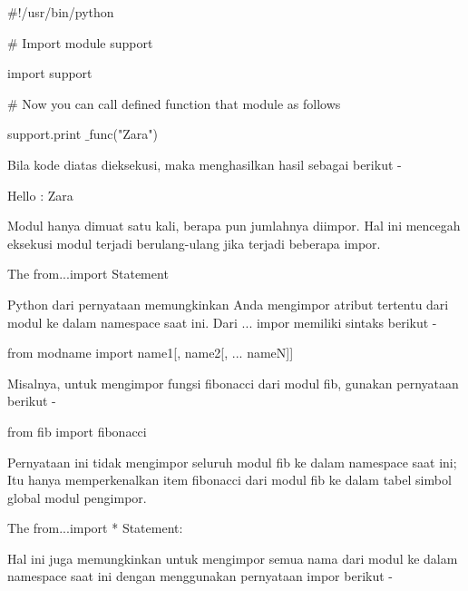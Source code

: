 \noindent 
 \hspace*{0.5in}  $  \#  $!/usr/bin/python \par
\vspace{12pt}
\noindent 
 \hspace*{0.5in}  $  \#  $ Import module support \par
\noindent 
 \hspace*{0.5in} import support \par
\vspace{12pt}
\noindent 
 \hspace*{0.5in}  $  \#  $ Now you can call defined function that module as follows \par
\noindent 
 \hspace*{0.5in} support.print $  \_  $func("Zara") \par
\noindent 
Bila kode diatas dieksekusi, maka menghasilkan hasil sebagai berikut - \par
\noindent 
 \hspace*{0.5in} Hello : Zara \par
\noindent 
Modul hanya dimuat satu kali, berapa pun jumlahnya diimpor. Hal ini mencegah eksekusi modul terjadi berulang-ulang jika terjadi beberapa impor. \par
\vspace{12pt}
\noindent 
The $  $from...import $  $Statement \par
\noindent 
Python dari pernyataan memungkinkan Anda mengimpor atribut tertentu dari modul ke dalam namespace saat ini. Dari ... impor memiliki sintaks berikut - \par
\noindent 
 \hspace*{0.5in} from modname import name1[, name2[, ... nameN]] \par
\noindent 
Misalnya, untuk mengimpor fungsi fibonacci dari modul fib, gunakan pernyataan berikut - \par
\noindent 
 \hspace*{0.5in} from fib import fibonacci \par
\noindent 
Pernyataan ini tidak mengimpor seluruh modul fib ke dalam namespace saat ini; Itu hanya memperkenalkan item fibonacci dari modul fib ke dalam tabel simbol global modul pengimpor. \par
\vspace{12pt}
\noindent 
The $  $from...import * $  $Statement: \par
\noindent 
Hal ini juga memungkinkan untuk mengimpor semua nama dari modul ke dalam namespace saat ini dengan menggunakan pernyataan impor berikut - \par
